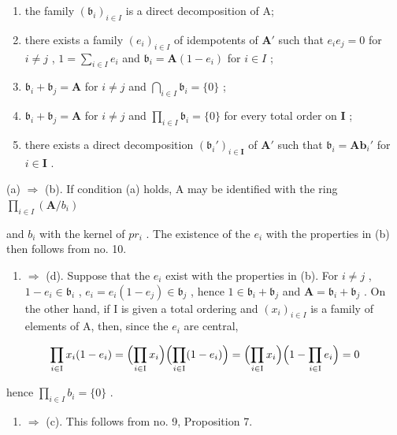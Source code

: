 \begin{enumerate}
\def\labelenumi{(\alph{enumi})}
\item
  the family \((\mathfrak{b}_i)_{i\in I}\) is a direct decomposition of A;
\item
  there exists a family \((e_i)_{i\in I}\) of idempotents of \(\mathbf{A}'\) such that \(e_i e_j = 0\) for \(i\neq j\) , \(1 = \sum_{i\in I}e_i\) and \(\mathfrak{b}_i = \mathbf{A}(1 - e_i)\) for \(i\in I\) ;
\item
  \(\mathfrak{b}_i + \mathfrak{b}_j = \mathbf{A}\) for \(i \neq j\) and \(\bigcap_{i \in I} \mathfrak{b}_i = \{0\}\) ;
\item
  \(\mathfrak{b}_i + \mathfrak{b}_j = \mathbf{A}\) for \(i \neq j\) and \(\prod_{i \in I} \mathfrak{b}_i = \{0\}\) for every total order on \(\mathbf{I}\) ;
\item
  there exists a direct decomposition \((\mathfrak{b}_i')_{i\in \mathbf{I}}\) of \(\mathbf{A}'\) such that \(\mathfrak{b}_i = \mathbf{Ab}_i'\) for \(i\in \mathbf{I}\) .
\end{enumerate}

(a) \(\Rightarrow\) (b). If condition (a) holds, A may be identified with the ring \(\prod_{i\in I}(\mathbf{A} / b_i)\)

and \(b_{i}\) with the kernel of \(pr_{i}\) . The existence of the \(e_{i}\) with the properties in (b) then follows from no. 10.

\begin{enumerate}
\def\labelenumi{(\alph{enumi})}
\setcounter{enumi}{1}
\tightlist
\item
  \(\Rightarrow\) (d). Suppose that the \(e_i\) exist with the properties in (b). For \(i \neq j\) , \(1 - e_i \in \mathfrak{b}_i\) , \(e_i = e_i(1 - e_j) \in \mathfrak{b}_j\) , hence \(1 \in \mathfrak{b}_i + \mathfrak{b}_j\) and \(\mathbf{A} = \mathfrak{b}_i + \mathfrak{b}_j\) . On the other hand, if I is given a total ordering and \((x_i)_{i \in I}\) is a family of elements of A, then, since the \(e_i\) are central,
\end{enumerate}

\[
\prod_ {i \in \mathrm{I}} x _ {i} (1 - e _ {i}) = \Bigl (\prod_ {i \in \mathrm{I}} x _ {i} \Bigr) \Bigl (\prod_ {i \in \mathrm{I}} (1 - e _ {i}) \Bigr) = \Bigl (\prod_ {i \in \mathrm{I}} x _ {i} \Bigr) \Bigl (1 - \prod_ {i \in \mathrm{I}} e _ {i} \Bigr) = 0
\]

hence \(\prod_{i\in I}b_i = \{0\}\) .

\begin{enumerate}
\def\labelenumi{(\alph{enumi})}
\setcounter{enumi}{3}
\item
  \(\Rightarrow\) (c). This follows from no. 9, Proposition 7.
\end{enumerate}

